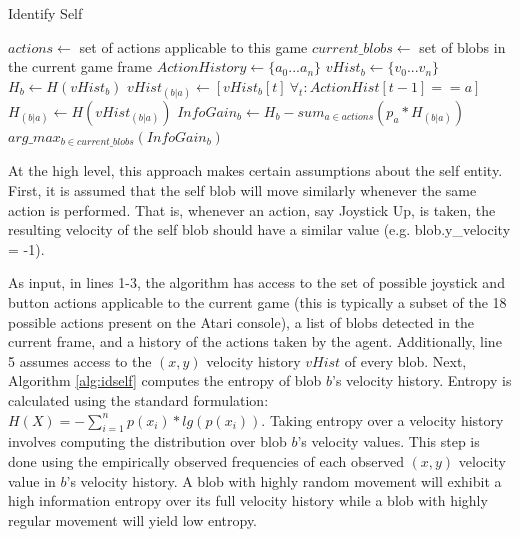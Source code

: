 \documentclass{acm_proc_article-sp}
\begin{document}
\begin{algorithm}
\caption{Identify Self}
\label{alg:idself}
\begin{algorithmic}[1]
  \STATE $actions \leftarrow $ set of actions applicable to this game
  \STATE $current\_blobs \leftarrow $ set of blobs in the current game frame
  \STATE $ActionHistory \leftarrow \{a_0...a_n\}$ %
  \STATE $vHist_b \leftarrow \{v_0...v_n\}$ %
  \STATE $H_b \leftarrow H(vHist_b)$ 
  \STATE $vHist_{(b|a)} \leftarrow [vHist_b[t] ~\forall_t: ActionHist[t-1] == a]$ 
  \STATE $H_{(b|a)} \leftarrow H(vHist_{(b|a)})$ %
  \ENDFOR
  \STATE $InfoGain_b \leftarrow H_b - sum_{a \in actions}(p_a * H_{(b|a)})$ %
  \ENDFOR
  \RETURN $arg\_max_{b \in current\_blobs}(InfoGain_b)$ %
\end{algorithmic}
\end{algorithm}

At the high level, this approach makes certain assumptions about the self entity. First, it is assumed that the self blob will move similarly whenever the same action is performed. That is, whenever an action, say Joystick Up, is taken, the resulting velocity of the self blob should have a similar value (e.g. blob.y\_velocity = -1). 

As input, in lines 1-3, the algorithm has access to the set of possible joystick and button actions applicable to the current game (this is typically a subset of the 18 possible actions present on the Atari console), a list of blobs detected in the current frame, and a history of the actions taken by the agent. Additionally, line 5 assumes access to the $(x,y)$ velocity history $vHist$ of every blob. Next, Algorithm \ref{alg:idself} computes the entropy of blob $b$'s velocity history. Entropy is calculated using the standard formulation: $H(X) = -\sum_{i=1}^n{p(x_i)*lg(p(x_i))}$. Taking entropy over a velocity history involves computing the distribution over blob $b$'s velocity values. This step is done using the empirically observed frequencies of each observed $(x,y)$ velocity value in $b$'s velocity history. A blob with highly random movement will exhibit a high information entropy over its full velocity history while a blob with highly regular movement will yield low entropy.
\end{document}
